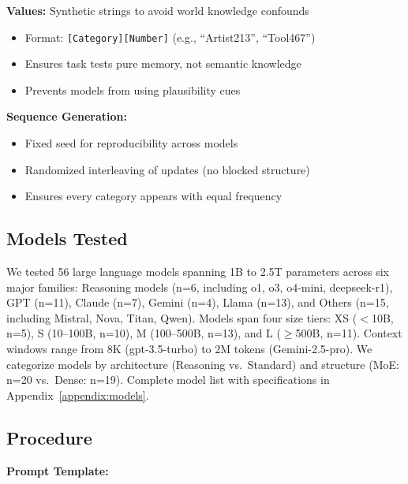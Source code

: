 \documentclass{article}
\begin{document}
\textbf{Values:} Synthetic strings to avoid world knowledge confounds
\begin{itemize}[itemsep=2pt,topsep=3pt,parsep=0pt]
    \item Format: \texttt{[Category][Number]} (e.g., ``Artist213'', ``Tool467'')
    \item Ensures task tests pure memory, not semantic knowledge
    \item Prevents models from using plausibility cues
\end{itemize}

\textbf{Sequence Generation:}
\begin{itemize}[itemsep=2pt,topsep=3pt,parsep=0pt]
    \item Fixed seed for reproducibility across models
    \item Randomized interleaving of updates (no blocked structure)
    \item Ensures every category appears with equal frequency
\end{itemize}

\subsection{Models Tested}

We tested 56 large language models spanning 1B to 2.5T parameters across six major families: Reasoning models (n=6, including o1, o3, o4-mini, deepseek-r1), GPT (n=11), Claude (n=7), Gemini (n=4), Llama (n=13), and Others (n=15, including Mistral, Nova, Titan, Qwen). Models span four size tiers: XS ($<$10B, n=5), S (10--100B, n=10), M (100--500B, n=13), and L ($\geq$500B, n=11). Context windows range from 8K (gpt-3.5-turbo) to 2M tokens (Gemini-2.5-pro). We categorize models by architecture (Reasoning vs.\ Standard) and structure (MoE: n=20 vs.\ Dense: n=19). Complete model list with specifications in Appendix~\ref{appendix:models}.

\subsection{Procedure}

\textbf{Prompt Template:}
\end{document}
